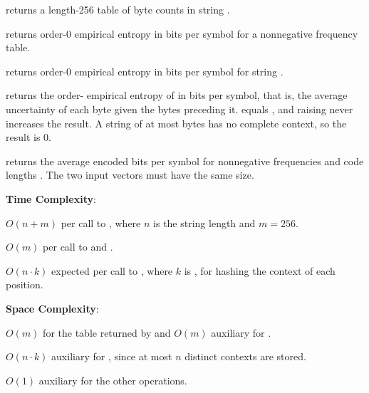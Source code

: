\begin{compactitem}
  \item {} returns a length-256 table of byte counts in string .
  \item {} returns order-0 empirical entropy in bits per symbol for a nonnegative frequency table.
  \item {} returns order-0 empirical entropy in bits per symbol for string .
  \item {} returns the order- empirical entropy of  in bits per symbol, that is, the average uncertainty of each byte given the  bytes preceding it.  equals , and raising  never increases the result. A string of at most  bytes has no complete context, so the result is $0$.
  \item {} returns the average encoded bits per symbol for nonnegative frequencies and code lengths . The two input vectors must have the same size.
\end{compactitem}

\textbf{Time Complexity}:
\begin{compactitem}
  \item $O(n + m)$ per call to , where $n$ is the string length and $m = 256$.
  \item $O(m)$ per call to  and .
  \item $O(n \cdot k)$ expected per call to , where $k$ is , for hashing the context of each position.
\end{compactitem}

\textbf{Space Complexity}:
\begin{compactitem}
  \item $O(m)$ for the table returned by  and $O(m)$ auxiliary for .
  \item $O(n \cdot k)$ auxiliary for , since at most $n$ distinct contexts are stored.
  \item $O(1)$ auxiliary for the other operations.
\end{compactitem}

